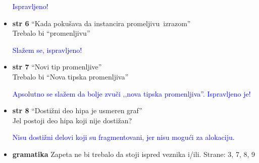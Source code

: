 \documentclass[a4paper]{report}
\newcommand{\odgovor}[1]{\textcolor{blue}{#1}}
\begin{document}
\begin{itemize}
\odgovor{Ispravljeno!}

\item \textbf{str 6} ``Kada pokušava da instancira \color{blue}promeljivu\color{black}~izrazom'' \\ Trebalo bi ``promenljivu''

\odgovor{Slažem se, ispravljeno!}

\item \textbf{str 7} ``Novi tip promenljive'' \\ Trebalo bi ``Nova tipska promenljiva''

\odgovor{Apsolutno se slažem da bolje zvuči ‚‚nova tipska promenljiva''. Ispravljeno je!}


\item \textbf{str 8} ``Dostižni deo hipa je usmeren graf'' \\ Jel postoji deo hipa koji nije dostižan?

\odgovor{Nisu dostižni delovi koji su fragmentovani, jer nisu mogući za alokaciju.}

\item \textbf{gramatika} Zapeta ne bi trebalo da stoji ispred veznika i/ili. Strane: 3, 7, 8, 9


\end{itemize}
\end{document}

